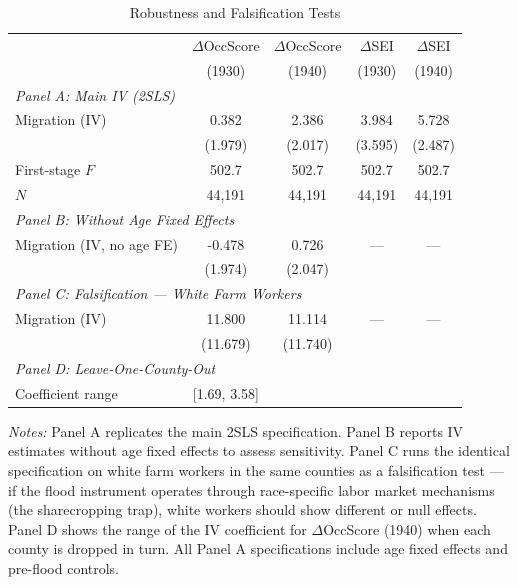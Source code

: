 \begin{table}[t]
\centering
\caption{Robustness and Falsification Tests}
\label{tab:robustness}
\begin{tabular}{lcccc}
\toprule
 & $\Delta$OccScore & $\Delta$OccScore & $\Delta$SEI & $\Delta$SEI \\
 & (1930) & (1940) & (1930) & (1940) \\
\midrule
\multicolumn{5}{l}{\textit{Panel A: Main IV (2SLS)}} \\
Migration (IV) & 0.382 & 2.386 & 3.984 & 5.728 \\
 & (1.979) & (2.017) & (3.595) & (2.487) \\
First-stage $F$ & 502.7 & 502.7 & 502.7 & 502.7 \\
$N$ & 44,191 & 44,191 & 44,191 & 44,191 \\
\midrule
\multicolumn{5}{l}{\textit{Panel B: Without Age Fixed Effects}} \\
Migration (IV, no age FE) & -0.478 & 0.726 & --- & --- \\
 & (1.974) & (2.047) & & \\
\midrule
\multicolumn{5}{l}{\textit{Panel C: Falsification --- White Farm Workers}} \\
Migration (IV) & 11.800 & 11.114 & --- & --- \\
 & (11.679) & (11.740) & & \\
\midrule
\multicolumn{5}{l}{\textit{Panel D: Leave-One-County-Out}} \\
Coefficient range & [1.69, 3.58] & & & \\
\bottomrule
\end{tabular}
\par\vspace{0.3em}
{\footnotesize
\textit{Notes:} Panel A replicates the main 2SLS specification. Panel B reports IV estimates without age fixed effects to assess sensitivity. Panel C runs the identical specification on white farm workers in the same counties as a falsification test --- if the flood instrument operates through race-specific labor market mechanisms (the sharecropping trap), white workers should show different or null effects. Panel D shows the range of the IV coefficient for $\Delta$OccScore (1940) when each county is dropped in turn. All Panel A specifications include age fixed effects and pre-flood controls.
}
\end{table}
